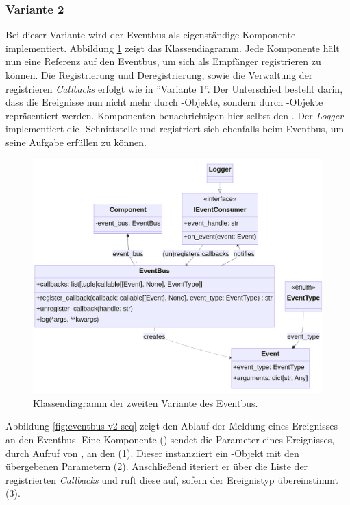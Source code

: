 \subsubsection*{Variante 2}

Bei dieser Variante wird der Eventbus als eigenständige Komponente implementiert. Abbildung \ref{fig:eventbus-v2-class} zeigt das Klassendiagramm. Jede Komponente hält nun eine Referenz auf den Eventbus, um sich als Empfänger registrieren zu können. Die Registrierung und Deregistrierung, sowie die Verwaltung der registrieren \emph{Callbacks} erfolgt wie in ''Variante 1''. Der Unterschied besteht darin, dass die Ereignisse nun nicht mehr durch -Objekte, sondern durch -Objekte repräsentiert werden. Komponenten benachrichtigen hier selbst den . Der \emph{Logger} implementiert die -Schnittstelle und registriert sich ebenfalls beim Eventbus, um seine Aufgabe erfüllen zu können.

\begin{figure}[H]
	\centering
	\includegraphics[width=1.0\linewidth]{images/diagrams/eventbus-v2-class.png}
	\caption{Klassendiagramm der zweiten Variante des Eventbus.}
	\label{fig:eventbus-v2-class}
\end{figure}

Abbildung \ref{fig:eventbus-v2-seq} zeigt den Ablauf der Meldung eines Ereignisses an den Eventbus. Eine Komponente () sendet die Parameter eines Ereignisses, durch Aufruf von , an den  (1). Dieser instanziiert ein -Objekt mit den übergebenen Parametern (2). Anschließend iteriert er über die Liste der registrierten \emph{Callbacks} und ruft diese auf, sofern der Ereignistyp übereinstimmt (3).

